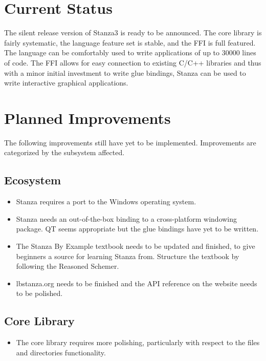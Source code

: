 \documentclass[fleqn, 12pt]{article}
\begin{document}
\maketitle

\section{Current Status}

The silent release version of Stanza3 is ready to be announced. The core library is fairly systematic, the language feature set is stable, and the FFI is full featured. The language can be comfortably used to write applications of up to 30000 lines of code. The FFI allows for easy connection to existing C/C++ libraries and thus with a minor initial investment to write glue bindings, Stanza can be used to write interactive graphical applications. 

\section{Planned Improvements}

The following improvements still have yet to be implemented. Improvements are categorized by the subsystem affected.

\subsection*{Ecosystem}
\begin{itemize}
\item Stanza requires a port to the Windows operating system.
\item Stanza needs an out-of-the-box binding to a cross-platform windowing package. QT seems appropriate but the glue bindings have yet to be written.
\item The Stanza By Example textbook needs to be updated and finished, to give beginners a source for learning Stanza from. Structure the textbook by following the Reasoned Schemer. 
\item lbstanza.org needs to be finished and the API reference on the website needs to be polished.
\end{itemize}

\subsection*{Core Library}
\begin{itemize}
\item The core library requires more polishing, particularly with respect to the files and directories functionality.

\end{itemize}
\end{document}
